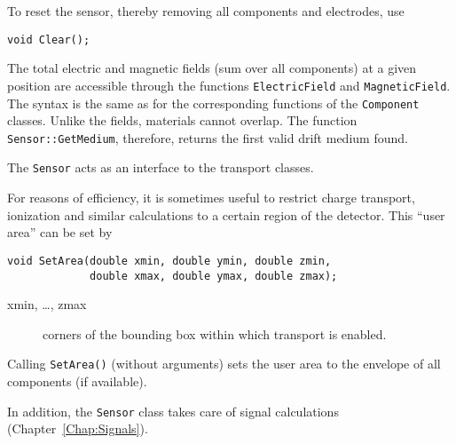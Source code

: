 To reset the sensor, thereby removing all components and electrodes, use
\begin{lstlisting}
void Clear();
\end{lstlisting}

The total electric and magnetic fields 
(sum over all components) at a given position are accessible through 
the functions \texttt{ElectricField} and \texttt{MagneticField}.
The syntax is the same as for the corresponding functions of the 
\texttt{Component} classes.
Unlike the fields, materials cannot overlap. 
The function \texttt{Sensor::GetMedium}, therefore, 
returns the first valid drift medium found. 
 
The \texttt{Sensor} acts as an interface to the transport classes.

For reasons of efficiency, it is sometimes useful to restrict 
charge transport, ionization and similar calculations to a 
certain region of the detector.
This ``user area'' can be set by
\begin{lstlisting}
void SetArea(double xmin, double ymin, double zmin,
             double xmax, double ymax, double zmax);
\end{lstlisting} 
\begin{description}
\item[xmin, \dots, zmax]
corners of the bounding box within which transport is enabled. 
\end{description}
Calling \texttt{SetArea()} (without arguments) sets the 
user area to the envelope of all components (if available).

In addition, the \texttt{Sensor} class takes care of 
signal calculations (Chapter~\ref{Chap:Signals}).

